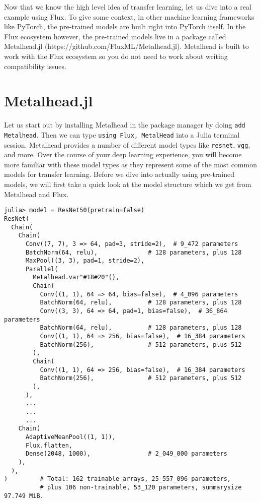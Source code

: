 \documentclass[
  notoc %
]{tufte-book}
\newcommand{\passthrough}[1]{#1}
\begin{document}
Now that we know the high level idea of transfer learning, let us dive
into a real example using Flux. To give some context, in other machine
learning frameworks like PyTorch, the pre-trained models are built right
into PyTorch itself. In the Flux ecosystem however, the pre-trained
models live in a package called Metalhead.jl
(https://github.com/FluxML/Metalhead.jl). Metalhead is built to work
with the Flux ecosystem so you do not need to work about writing
compatibility issues.

\hypertarget{sec:metalhead}{%
\section{Metalhead.jl}\label{sec:metalhead}}

Let us start out by installing Metalhead in the package manager by doing
\passthrough{\lstinline!add Metalhead!}. Then we can type
\passthrough{\lstinline!using Flux, MetalHead!} into a Julia terminal
session. Metalhead provides a number of different model types like
\passthrough{\lstinline!resnet!}, \passthrough{\lstinline!vgg!}, and
more. Over the course of your deep learning experience, you will become
more familiar with these model types as they represent some of the most
common models for transfer learning. Before we dive into actually using
pre-trained models, we will first take a quick look at the model
structure which we get from Metalhead and Flux.

\begin{lstlisting}
julia> model = ResNet50(pretrain=false)
ResNet(
  Chain(
    Chain(
      Conv((7, 7), 3 => 64, pad=3, stride=2),  # 9_472 parameters
      BatchNorm(64, relu),              # 128 parameters, plus 128
      MaxPool((3, 3), pad=1, stride=2),
      Parallel(
        Metalhead.var"#18#20"(),
        Chain(
          Conv((1, 1), 64 => 64, bias=false),  # 4_096 parameters
          BatchNorm(64, relu),          # 128 parameters, plus 128
          Conv((3, 3), 64 => 64, pad=1, bias=false),  # 36_864 parameters
          BatchNorm(64, relu),          # 128 parameters, plus 128
          Conv((1, 1), 64 => 256, bias=false),  # 16_384 parameters
          BatchNorm(256),               # 512 parameters, plus 512
        ),
        Chain(
          Conv((1, 1), 64 => 256, bias=false),  # 16_384 parameters
          BatchNorm(256),               # 512 parameters, plus 512
        ),
      ),
      ...
      ...
      ...
    Chain(
      AdaptiveMeanPool((1, 1)),
      Flux.flatten,
      Dense(2048, 1000),                # 2_049_000 parameters
    ),
  ),
)         # Total: 162 trainable arrays, 25_557_096 parameters,
          # plus 106 non-trainable, 53_120 parameters, summarysize 97.749 MiB.
\end{lstlisting}
\end{document}
